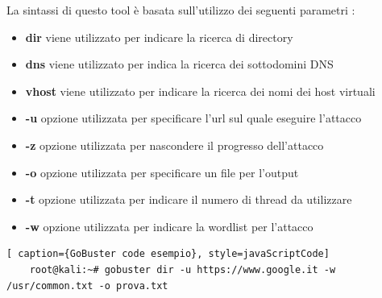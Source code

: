 La sintassi di questo tool è basata sull'utilizzo dei seguenti parametri :
\begin{itemize}
    \item \textbf{dir} viene utilizzato per indicare la ricerca di directory
    \item \textbf{dns} viene utilizzato per indica la ricerca dei sottodomini DNS
    \item \textbf{vhost} viene utilizzato per indicare la ricerca dei nomi dei host virtuali
    \item \textbf{-u} opzione  utilizzata per specificare l'url sul quale eseguire l'attacco
    \item \textbf{-z} opzione utilizzata per nascondere il progresso dell'attacco
    \item \textbf{-o} opzione utilizzata per specificare un file per l'output 
    \item \textbf{-t} opzione utilizzata per indicare il numero di thread da utilizzare 
    \item \textbf{-w} opzione utilizzata per indicare la wordlist per l'attacco
\end{itemize}

\begin{lstlisting}[ caption={GoBuster code esempio}, style=javaScriptCode]
    root@kali:~# gobuster dir -u https://www.google.it -w /usr/common.txt -o prova.txt
\end{lstlisting}

\label{chap:conc}

